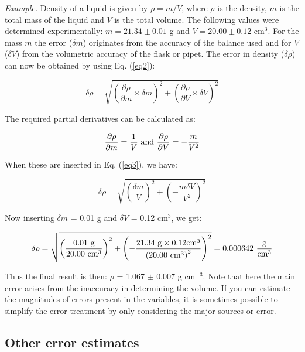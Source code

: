 \documentclass[byrevtex,amssymb,aps,pra,floatfix,letterpaper]{revtex4}
\begin{document}
\noindent
\textit{Example.} Density of a liquid is given by $\rho = m / V$, where $\rho$ is the density, $m$ is the total mass of the liquid and $V$ is the total volume. The following values were determined experimentally: $m = 21.34 \pm 0.01$ g and $V = 20.00 \pm 0.12$ cm$^3$. For the mass $m$ the error ($\delta m$) originates from the
accuracy of the balance used and for $V$ ($\delta V$) from the volumetric accuracy of the flask or pipet. The error in density ($\delta\rho$) can now be obtained by using Eq. (\ref{eq2}):

\begin{equation}
\label{eq3}
\delta\rho = \sqrt{\left(\frac{\partial\rho}{\partial m}\times\delta m\right)^2 + \left(\frac{\partial\rho}{\partial V}\times\delta V\right)^2}
\end{equation}

\noindent
The required partial derivatives can be calculated as:

\begin{equation}
\label{eq4}
\frac{\partial\rho}{\partial m} = \frac{1}{V}\textnormal{ and }\frac{\partial\rho}{\partial V} = -\frac{m}{V^2} 
\end{equation}

\noindent
When these are inserted in Eq. (\ref{eq3}), we have:

\begin{equation}
\label{eq5}
\delta\rho = \sqrt{\left(\frac{\delta m}{V}\right)^2 + \left(-\frac{m\delta V}{V^2}\right)^2}
\end{equation}

\noindent
Now inserting $\delta m$ = 0.01 g and $\delta V$ = 0.12 cm$^3$, we get:

\begin{equation}
\label{eq6}
\delta\rho = \sqrt{\left(\frac{0.01\textnormal{ g}}{20.00\textnormal{ cm}^3}\right)^2 + \left(-\frac{21.34\textnormal{ g}\times0.12\textnormal{cm}^3}{\left(20.00\textnormal{ cm}^3\right)^2}\right)^2} = 0.000642\textnormal{~}\frac{\textnormal{g}}{\textnormal{cm}^3}
\end{equation}

\noindent
Thus the final result is then: $\rho$ = 1.067 $\pm$ 0.007 g cm$^{-3}$. Note that here the main error arises from the inaccuracy in determining the volume. If you can estimate the magnitudes of errors present in the variables, it is sometimes possible to simplify the error treatment by only considering the major sources or error.

\subsection{Other error estimates}
\end{document}
